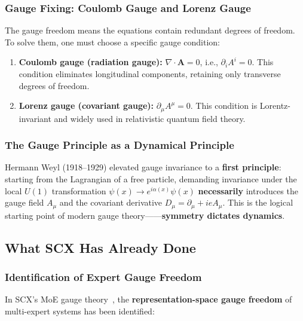 \documentclass[12pt,a4paper]{article}
\theoremstyle{remark}
\begin{document}
\subsubsection{Gauge Fixing: Coulomb Gauge and Lorenz Gauge}

The gauge freedom means the equations contain redundant degrees of freedom.
To solve them, one must choose a specific gauge condition:

\begin{enumerate}[label=(\roman*)]
    \item \textbf{Coulomb gauge (radiation gauge):} $\nabla \cdot \mathbf{A} = 0$,
    i.e., $\partial_i A^i = 0$. This condition eliminates longitudinal components, retaining only transverse degrees of freedom.

    \item \textbf{Lorenz gauge (covariant gauge):} $\partial_\mu A^\mu = 0$.
    This condition is Lorentz-invariant and widely used in relativistic quantum field theory.
\end{enumerate}

\subsubsection{The Gauge Principle as a Dynamical Principle}

Hermann Weyl (1918--1929) elevated gauge invariance to a \textbf{first principle}:
starting from the Lagrangian of a free particle, demanding invariance under the local $U(1)$ transformation
$\psi(x) \to e^{i\alpha(x)}\psi(x)$ \textbf{necessarily} introduces the gauge field $A_\mu$ and the covariant derivative $D_\mu = \partial_\mu + i e A_\mu$.
This is the logical starting point of modern gauge theory——\textbf{symmetry dictates dynamics}.

\subsection{What SCX Has Already Done}

\subsubsection{Identification of Expert Gauge Freedom}

In SCX's MoE gauge theory~\cite{scx_moe_gauge}, the \textbf{representation-space gauge freedom} of multi-expert systems has been identified:
\end{document}
